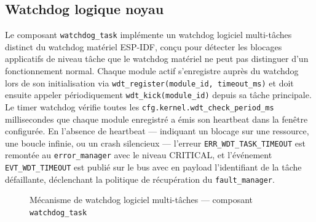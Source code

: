 \subsection{Watchdog logique noyau}
\label{subsec:wdt_impl}

Le composant \texttt{watchdog\_task} implémente un watchdog logiciel
multi-tâches distinct du watchdog matériel ESP-IDF, conçu pour détecter
les blocages applicatifs de niveau tâche que le watchdog matériel ne
peut pas distinguer d'un fonctionnement normal. Chaque module
actif s'enregistre auprès du watchdog lors de son initialisation via
\texttt{wdt\_register(module\_id, timeout\_ms)} et doit ensuite
appeler périodiquement \texttt{wdt\_kick(module\_id)} depuis sa
tâche principale. Le timer watchdog vérifie toutes les
\texttt{cfg.kernel.wdt\_check\_period\_ms} millisecondes que chaque
module enregistré a émis son heartbeat dans la fenêtre configurée.
En l'absence de heartbeat --- indiquant un blocage sur une ressource,
une boucle infinie, ou un crash silencieux --- l'erreur
\texttt{ERR\_WDT\_TASK\_TIMEOUT} est remontée au \texttt{error\_manager}
avec le niveau CRITICAL, et l'événement \texttt{EVT\_WDT\_TIMEOUT}
est publié sur le bus avec en payload l'identifiant de la tâche
défaillante, déclenchant la politique de récupération du
\texttt{fault\_manager}.

\begin{figure}[H]
\centering
{}
\caption{Mécanisme de watchdog logiciel multi-tâches --- composant \texttt{watchdog\_task}}
\label{fig:wdt_mechanism}
\end{figure}

